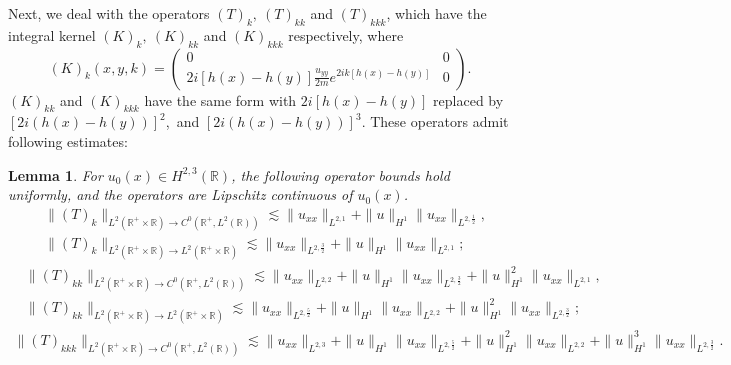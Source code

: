 \documentclass[11pt]{article}
\numberwithin{equation}{section}
\newtheorem{lemma}{Lemma}
\begin{document}
Next, we deal with the operators $(T)_k,\ (T)_{kk}$ and $(T)_{kkk}$, which have the integral kernel $(K)_k,\ (K)_{kk}$ and $(K)_{kkk}$ respectively, where
\begin{equation}
(K)_{k}(x,y,k)=\left(\begin{array}{cc}0&0\\2i\left[h(x)-h(y)\right]\frac{u_{yy}}{2m}e^{2ik\left[h(x)-h(y)\right]}&0\end{array}\right).
\end{equation}
$(K)_{kk}$ and $(K)_{kkk}$  have the same form with $2i\left[h(x)-h(y)\right]$ replaced by $\left[2i(h(x)-h(y))\right]^2$,\ and $\left[2i(h(x)-h(y))\right]^3$. These operators admit following estimates:
\begin{lemma}\label{tk}
For $u_0(x) \in H^{2,3}(\mathbb{R})$, the following operator bounds hold uniformly, and the operators are Lipschitz continuous of $u_0(x)$.
\begin{equation*}
\begin{aligned} &\| (T)_k\|_{L^2(\mathbb{R}^+\times\mathbb{R})\to C^0(\mathbb{R}^+,L^2(\mathbb{R}))}\lesssim\| u_{xx}\|_{L^{2,1}}+\| u\|_{H^{1}}\| u_{xx}\|_{L^{2,\frac{1}{2}}},\\
&\| (T)_k\|_{L^2(\mathbb{R}^+\times\mathbb{R})\to L^2(\mathbb{R}^+\times\mathbb{R})}\lesssim\| u_{xx}\|_{L^{2,\frac{3}{2}}}+\| u\|_{H^{1}}\| u_{xx}\|_{L^{2,1}};
\end{aligned}
\end{equation*}
\begin{equation*}
\begin{aligned} &\| (T)_{kk}\|_{L^2(\mathbb{R}^+\times\mathbb{R})\to C^0(\mathbb{R}^+,L^2(\mathbb{R}))}\lesssim\| u_{xx}\|_{L^{2,2}}+\| u\|_{H^{1}}\| u_{xx}\|_{L^{2,\frac{3}{2}}}+\| u\| ^2_{H^{1}}\| u_{xx}\|_{L^{2,1}},\\
&\| (T)_{kk}\|_{L^2(\mathbb{R}^+\times\mathbb{R})\to L^2(\mathbb{R}^+\times\mathbb{R})}\lesssim\| u_{xx}\|_{L^{2,\frac{5}{2}}}+\| u\|_{H^{1}}\| u_{xx}\|_{L^{2,2}}+\| u\| ^2_{H^{1}}\| u_{xx}\|_{L^{2,\frac{3}{2}}};
\end{aligned}
\end{equation*}
\begin{align*}
\| (T)_{kkk}\|_{L^2(\mathbb{R}^+\times\mathbb{R})\to C^0(\mathbb{R}^+,L^2(\mathbb{R}))}\lesssim\| u_{xx}\|_{L^{2,3}}+\| u\|_{H^{1}}\| u_{xx}\|_{L^{2,\frac{5}{2}}}+\| u\|^2_{H^{1}}\|u_{xx}\|_{L^{2,2}}+\| u\| ^3_{H^{1}}\| u_{xx}\|_{L^{2,\frac{3}{2}}}.
\end{align*}

\end{lemma}
\end{document}
